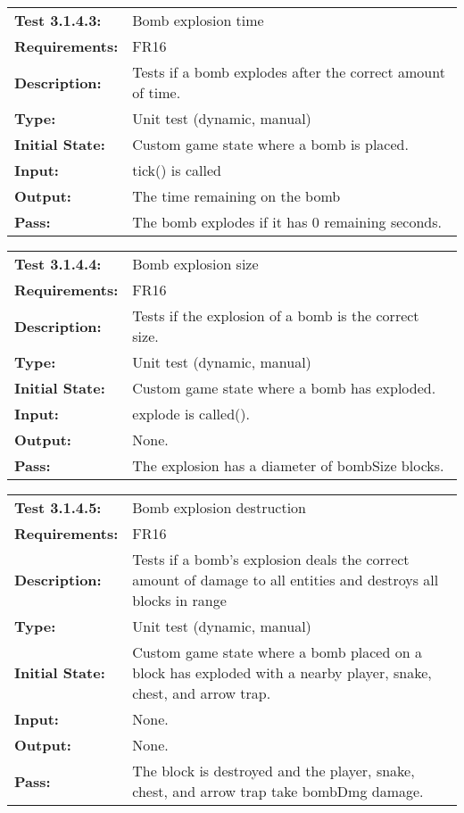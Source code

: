 \documentclass[12pt, titlepage]{article}
\begin{document}
\begin{tabular}{|l|p{10cm}|}
    \hline
    \bf{Test} 3.1.4.3: & Bomb explosion time \\
    \bf{Requirements}: & FR16 \\
    \bf{Description}: &  Tests if a bomb explodes after the correct amount of time.\\
    \bf{Type}: & Unit test (dynamic, manual) \\
    \bf{Initial State}: & Custom game state where a bomb is placed. \\
    \bf{Input}: & tick() is called \\
    \bf{Output}: & The time remaining on the bomb \\
    \bf{Pass}: &  The bomb explodes if it has $0$ remaining seconds.\\
    \hline
\end{tabular}

\begin{tabular}{|l|p{10cm}|}
    \hline
    \bf{Test} 3.1.4.4: & Bomb explosion size \\
    \bf{Requirements}: & FR16 \\
    \bf{Description}: &  Tests if the explosion of a bomb is the correct size.\\
    \bf{Type}: & Unit test (dynamic, manual) \\
    \bf{Initial State}: & Custom game state where a bomb has exploded. \\
    \bf{Input}: & explode is called(). \\
    \bf{Output}: & None. \\
    \bf{Pass}: &  The explosion has a diameter of bombSize blocks.\\
    \hline
\end{tabular}

\begin{tabular}{|l|p{10cm}|}
    \hline
    \bf{Test} 3.1.4.5: & Bomb explosion destruction \\
    \bf{Requirements}: & FR16 \\
    \bf{Description}: &  Tests if a bomb's explosion deals the correct amount of damage to all entities and destroys all blocks in range \\
    \bf{Type}: & Unit test (dynamic, manual) \\
    \bf{Initial State}: & Custom game state where a bomb placed on a block has exploded with a nearby player, snake, chest, and arrow trap. \\
    \bf{Input}: & None. \\
    \bf{Output}: & None.  \\
    \bf{Pass}: &  The block is destroyed and the player, snake, chest, and arrow trap take bombDmg damage.\\
    \hline
\end{tabular}
\end{document}
